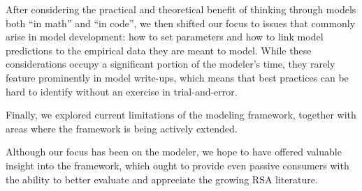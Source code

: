 \documentclass{sp}
\begin{document}
After considering the practical and theoretical benefit of thinking through models both ``in math'' and ``in code'', 
we then shifted our focus to issues that commonly arise in model development: how to set parameters and how to link model predictions to the empirical data they are meant to model. While these considerations occupy a significant portion of the modeler's time, they rarely feature prominently in model write-ups, which means that best practices can be hard to identify without an exercise in trial-and-error.

Finally, we explored current limitations of the modeling framework, together with areas where the framework is being actively extended.

Although our focus has been on the modeler, we hope to have offered valuable insight into the framework, which ought to provide even passive consumers with the ability to better evaluate and appreciate the growing RSA literature.







\end{document}
